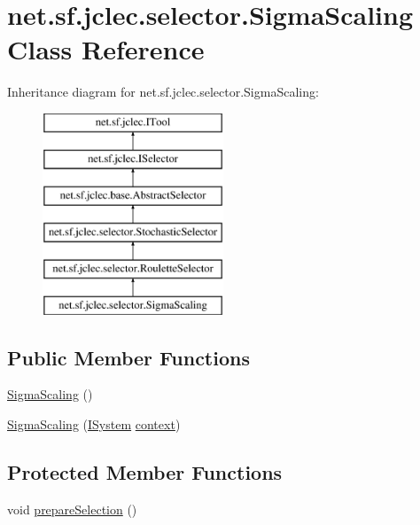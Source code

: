 \hypertarget{classnet_1_1sf_1_1jclec_1_1selector_1_1_sigma_scaling}{\section{net.\-sf.\-jclec.\-selector.\-Sigma\-Scaling Class Reference}
\label{classnet_1_1sf_1_1jclec_1_1selector_1_1_sigma_scaling}
}
Inheritance diagram for net.\-sf.\-jclec.\-selector.\-Sigma\-Scaling\-:\begin{figure}[H]
\begin{center}
\leavevmode
\includegraphics[height=6.000000cm]{classnet_1_1sf_1_1jclec_1_1selector_1_1_sigma_scaling}
\end{center}
\end{figure}
\subsection*{Public Member Functions}
\begin{DoxyCompactItemize}
\item 
\hyperlink{classnet_1_1sf_1_1jclec_1_1selector_1_1_sigma_scaling_a4c808e39d0782b70ff86e8aa05bebe6d}{Sigma\-Scaling} ()
\item 
\hyperlink{classnet_1_1sf_1_1jclec_1_1selector_1_1_sigma_scaling_a28d26372299e47bccc93f828bd4c22d1}{Sigma\-Scaling} (\hyperlink{interfacenet_1_1sf_1_1jclec_1_1_i_system}{I\-System} \hyperlink{classnet_1_1sf_1_1jclec_1_1base_1_1_abstract_selector_a4304fe5c27aa7631dc91678d22473b94}{context})
\end{DoxyCompactItemize}
\subsection*{Protected Member Functions}
\begin{DoxyCompactItemize}
\item 
void \hyperlink{classnet_1_1sf_1_1jclec_1_1selector_1_1_sigma_scaling_ad513ba7df2641cb9116ddc3e277dc508}{prepare\-Selection} ()
\end{DoxyCompactItemize}
